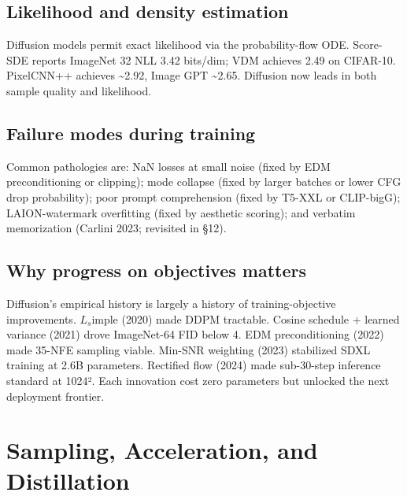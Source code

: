 \documentclass{article}
\begin{document}
\subsection{Likelihood and density estimation}\label{likelihood-and-density-estimation}

Diffusion models permit exact likelihood via the probability-flow ODE. Score-SDE reports ImageNet 32 NLL 3.42 bits/dim; VDM achieves 2.49 on CIFAR-10. PixelCNN++ achieves \textasciitilde2.92, Image GPT \textasciitilde2.65. Diffusion now leads in both sample quality and likelihood.

\subsection{Failure modes during training}\label{failure-modes-during-training}

Common pathologies are: NaN losses at small noise (fixed by EDM preconditioning or clipping); mode collapse (fixed by larger batches or lower CFG drop probability); poor prompt comprehension (fixed by T5-XXL or CLIP-bigG); LAION-watermark overfitting (fixed by aesthetic scoring); and verbatim memorization (Carlini 2023; revisited in §12).

\subsection{Why progress on objectives matters}\label{why-progress-on-objectives-matters}

Diffusion's empirical history is largely a history of training-objective improvements. \(L_s\)imple (2020) made DDPM tractable. Cosine schedule + learned variance (2021) drove ImageNet-64 FID below 4. EDM preconditioning (2022) made 35-NFE sampling viable. Min-SNR weighting (2023) stabilized SDXL training at 2.6B parameters. Rectified flow (2024) made sub-30-step inference standard at 1024². Each innovation cost zero parameters but unlocked the next deployment frontier.

\section{Sampling, Acceleration, and Distillation}\label{sampling-acceleration-and-distillation}
\end{document}
